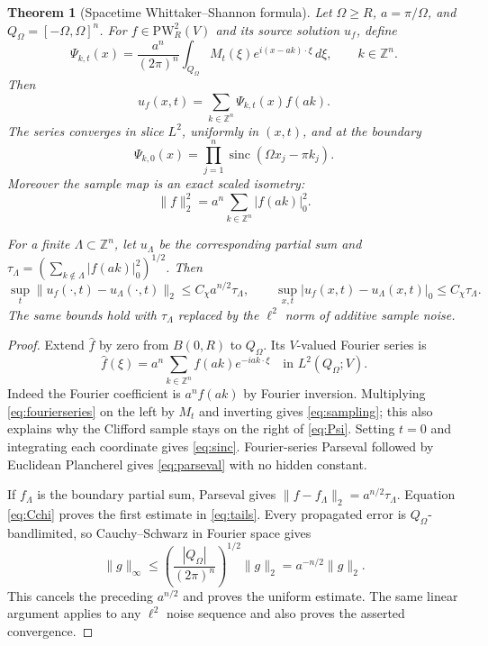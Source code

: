 \documentclass[10pt]{article}
\newtheorem{theorem}{Theorem}
\newcommand{\Z}{\mathbb Z}
\newcommand{\PW}{\mathrm{PW}}
\newcommand{\sinc}{\operatorname{sinc}}
\begin{document}
\begin{theorem}[Spacetime Whittaker--Shannon formula]\label{thm:sampling}
Let $\Omega\geq R$, $a=\pi/\Omega$, and
$Q_\Omega=[-\Omega,\Omega]^n$.  For $f\in\PW_R^2(V)$ and its source solution
$u_f$, define
\begin{equation}\label{eq:Psi}
 \Psi_{k,t}(x)=\frac{a^n}{(2\pi)^n}
 \int_{Q_\Omega}M_t(\xi)e^{i(x-ak)\cdot\xi}\,d\xi,
 \qquad k\in\Z^n.
\end{equation}
Then
\begin{equation}\label{eq:sampling}
 u_f(x,t)=\sum_{k\in\Z^n}\Psi_{k,t}(x)f(ak).
\end{equation}
The series converges in slice $L^2$, uniformly in $(x,t)$, and at the boundary
\begin{equation}\label{eq:sinc}
 \Psi_{k,0}(x)=\prod_{j=1}^n\sinc(\Omega x_j-\pi k_j).
\end{equation}
Moreover the sample map is an exact scaled isometry:
\begin{equation}\label{eq:parseval}
 \|f\|_2^2=a^n\sum_{k\in\Z^n}|f(ak)|_0^2.
\end{equation}

For a finite $\Lambda\subset\Z^n$, let $u_\Lambda$ be the corresponding
partial sum and
$\tau_\Lambda=(\sum_{k\notin\Lambda}|f(ak)|_0^2)^{1/2}$.  Then
\begin{equation}\label{eq:tails}
 \sup_t\|u_f(\cdot,t)-u_\Lambda(\cdot,t)\|_2
 \leq C_\chi a^{n/2}\tau_\Lambda,
 \qquad
 \sup_{x,t}|u_f(x,t)-u_\Lambda(x,t)|_0
 \leq C_\chi\tau_\Lambda.
\end{equation}
The same bounds hold with $\tau_\Lambda$ replaced by the $\ell^2$ norm of
additive sample noise.
\end{theorem}

\begin{proof}
Extend $\widehat f$ by zero from $B(0,R)$ to $Q_\Omega$.  Its $V$-valued
Fourier series is
\begin{equation}\label{eq:fourierseries}
 \widehat f(\xi)=a^n\sum_{k\in\Z^n}f(ak)e^{-iak\cdot\xi}
 \quad\text{in }L^2(Q_\Omega;V).
\end{equation}
Indeed the Fourier coefficient is $a^nf(ak)$ by Fourier inversion.
Multiplying \eqref{eq:fourierseries} on the left by $M_t$ and inverting gives
\eqref{eq:sampling}; this also explains why the Clifford sample stays on the
right of \eqref{eq:Psi}.  Setting $t=0$ and integrating each coordinate gives
\eqref{eq:sinc}.  Fourier-series Parseval followed by Euclidean Plancherel
gives \eqref{eq:parseval} with no hidden constant.

If $f_\Lambda$ is the boundary partial sum, Parseval gives
$\|f-f_\Lambda\|_2=a^{n/2}\tau_\Lambda$.  Equation \eqref{eq:Cchi} proves the
first estimate in \eqref{eq:tails}.  Every propagated error is
$Q_\Omega$-bandlimited, so Cauchy--Schwarz in Fourier space gives
\[
 \|g\|_\infty\leq
 \left(\frac{|Q_\Omega|}{(2\pi)^n}\right)^{1/2}\|g\|_2
 =a^{-n/2}\|g\|_2.
\]
This cancels the preceding $a^{n/2}$ and proves the uniform estimate.  The
same linear argument applies to any $\ell^2$ noise sequence and also proves
the asserted convergence.
\end{proof}
\end{document}
